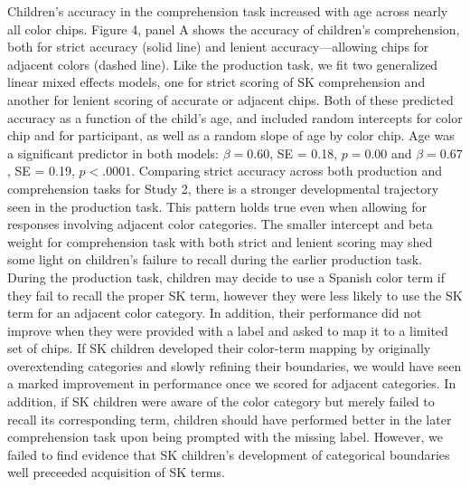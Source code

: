 \documentclass[
  english,
  ,man,floatsintext]{apa6}
\begin{document}
Children's accuracy in the comprehension task increased with age across nearly all color chips. Figure 4, panel A shows the accuracy of children's comprehension, both for strict accuracy (solid line) and lenient accuracy---allowing chips for adjacent colors (dashed line). Like the production task, we fit two generalized linear mixed effects models, one for strict scoring of SK comprehension and another for lenient scoring of accurate or adjacent chips. Both of these predicted accuracy as a function of the child's age, and included random intercepts for color chip and for participant, as well as a random slope of age by color chip. Age was a significant predictor in both models: \(\beta = 0.60\), SE = 0.18, \(p = 0.00\) and \(\beta = 0.67\), SE = 0.19, \(p < .0001\).
Comparing strict accuracy across both production and comprehension tasks for Study 2, there is a stronger developmental trajectory seen in the production task. This pattern holds true even when allowing for responses involving adjacent color categories. The smaller intercept and beta weight for comprehension task with both strict and lenient scoring may shed some light on children's failure to recall during the earlier production task. During the production task, children may decide to use a Spanish color term if they fail to recall the proper SK term, however they were less likely to use the SK term for an adjacent color category. In addition, their performance did not improve when they were provided with a label and asked to map it to a limited set of chips. If SK children developed their color-term mapping by originally overextending categories and slowly refining their boundaries, we would have seen a marked improvement in performance once we scored for adjacent categories. In addition, if SK children were aware of the color category but merely failed to recall its corresponding term, children should have performed better in the later comprehension task upon being prompted with the missing label. However, we failed to find evidence that SK children's development of categorical boundaries well preceeded acquisition of SK terms.
\end{document}

